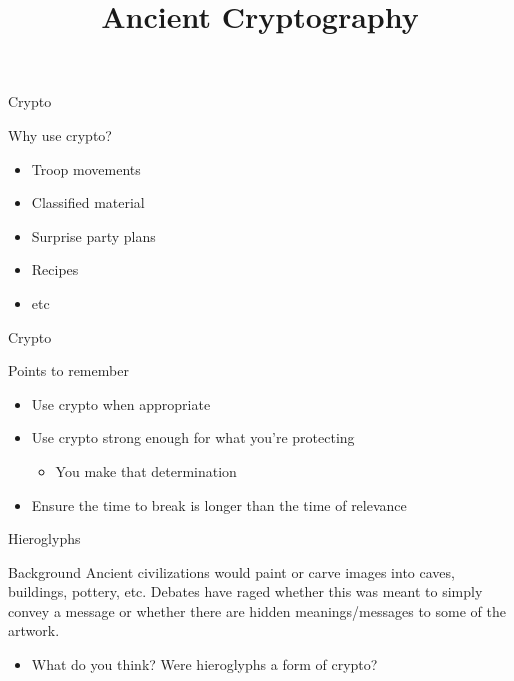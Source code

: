 \documentclass{beamer}
\title{Ancient Cryptography}
\begin{document}
\begin{frame}
	\titlepage
\end{frame}

\begin{frame}{Crypto}
	\begin{block}{Why use crypto?}
		\begin{itemize}
			\item Troop movements
			\item Classified material
			\item Surprise party plans
			\item Recipes
			\item etc
		\end{itemize}
	\end{block}
\end{frame}

\begin{frame}{Crypto}
	\begin{block}{Points to remember}
		\begin{itemize}
			\item Use crypto when appropriate
			\item Use crypto strong enough for what you're protecting
				\begin{itemize}
					\item You make that determination
				\end{itemize}
			\item Ensure the time to break is longer than the time of relevance
		\end{itemize}
	\end{block}
\end{frame}

\begin{frame}{Hieroglyphs}
	\begin{block}{Background}
		Ancient civilizations would paint or carve images into caves, buildings, pottery, etc. Debates have raged whether this was meant to simply convey a message or whether there are hidden meanings/messages to some of the artwork.
	\end{block}
	\begin{block}{}
		\begin{itemize}
			\item What do you think? Were hieroglyphs a form of crypto?
		\end{itemize}
	\end{block}
\end{frame}
\end{document}
